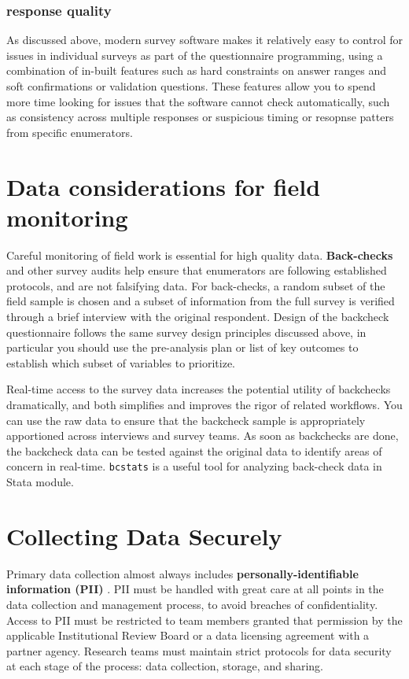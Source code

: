 \subsubsection{response quality}
As discussed above, modern survey software makes it relatively easy to control for issues in individual surveys as part of the questionnaire programming, using a combination of in-built features such as hard constraints on answer ranges and soft confirmations or validation questions. These features allow you to spend more time looking for issues that the software cannot check automatically, such as consistency across multiple responses or suspicious timing or resopnse patters from specific enumerators. 


\section{Data considerations for field monitoring}
Careful monitoring of field work is essential for high quality data. 
\textbf{Back-checks}
and other survey audits help ensure that enumerators are following established protocols, and are not falsifying data. 
For back-checks, a random subset of the field sample is chosen and a subset of information from the full survey is verified through a brief interview with the original respondent. Design of the backcheck questionnaire follows the same survey design principles discussed above, in particular you should use the pre-analysis plan or list of key outcomes to establish which subset of variables to prioritize. 

Real-time access to the survey data increases the potential utility of backchecks dramatically, and both simplifies and improves the rigor of related workflows. You can use the raw data to ensure that the backcheck sample is appropriately apportioned across interviews and survey teams. As soon as backchecks are done, the backcheck data can be tested against the original data to identify areas of concern in real-time. 
\texttt{bcstats} is a useful tool for analyzing back-check data in Stata module.


\section{Collecting Data Securely}
Primary data collection almost always includes 
\textbf{personally-identifiable information (PII)} . 
PII must be handled with great care at all points in the data collection and management process, to avoid breaches of confidentiality. 
Access to PII must be restricted to team members granted that permission by the applicable Institutional Review Board or a data licensing agreement with a partner agency. Research teams must maintain strict protocols for data security at each stage of the process: data collection, storage, and sharing. 

